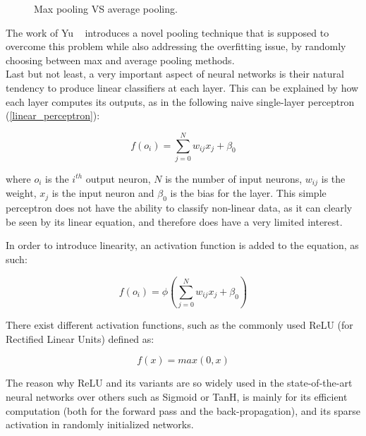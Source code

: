\begin{figure}[h]
{}
	\label{fig:pooling}
	\caption{Max pooling VS average pooling.}
\end{figure}

The work of Yu \etal~\cite{MixedPooling} introduces a novel pooling
technique that is supposed to overcome this problem while also addressing the
overfitting issue, by randomly choosing between max and average pooling
methods.\\

Last but not least, a very important aspect of neural networks is their
natural tendency to produce linear classifiers at each layer. This can be
explained by how each layer computes its outputs, as in the following naive
single-layer perceptron (\ref{linear_perceptron}):

\begin{equation} \label{linear_perceptron}
	f(o_i) = \displaystyle\sum_{j=0}^{N} w_{ij}x_j+\beta_0
\end{equation}


where $o_i$ is the $i^{th}$ output neuron, $N$ is the number of input neurons,
$w_{ij}$ is the weight, $x_j$ is the input neuron and $\beta_0$ is the bias for
the layer. This simple perceptron does not have the ability to classify
non-linear data, as it can clearly be seen by its linear equation, and
therefore does have a very limited interest.

In order to introduce linearity, an activation function is added to the
equation, as such:

\begin{equation} \label{nonlinear_perceptron}
	f(o_i) = \phi(\displaystyle\sum_{j=0}^{N} w_{ij}x_j+\beta_0)
\end{equation}

There exist different activation functions, such as the commonly used ReLU (for
Rectified Linear Units) defined as:

\begin{equation} \label{relu}
	f(x) = max(0, x)
\end{equation}

The reason why ReLU and its variants are so widely used in the state-of-the-art
neural networks over others such as Sigmoid or TanH, is mainly for its
efficient computation (both for the forward pass and the back-propagation), and
its sparse activation in randomly initialized networks.

